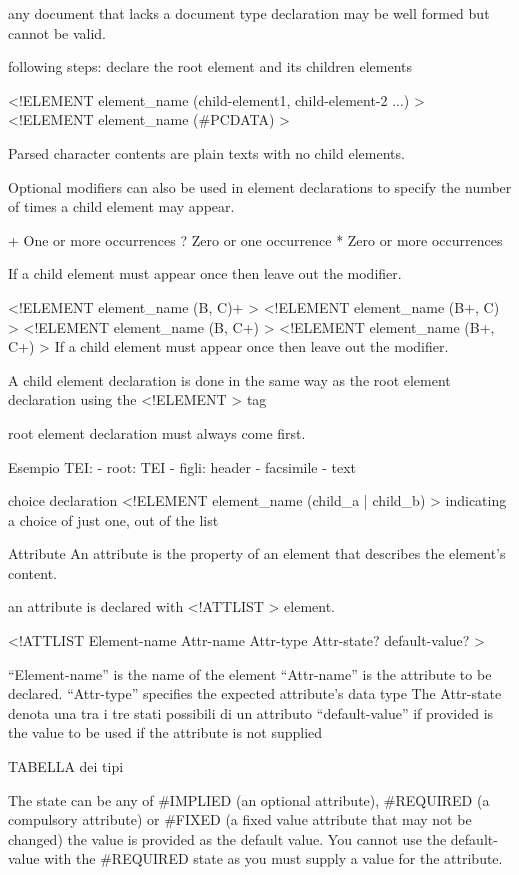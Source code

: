 any document that lacks a document type declaration may be well formed but
cannot be valid.


following steps:
declare the root element and its children elements

<!ELEMENT element_name (child-element1, child-element-2 ...) >
<!ELEMENT element_name (#PCDATA) >

Parsed character contents are plain texts with no child elements.

Optional modifiers can also be used in element declarations to specify the
number of times a child element may appear.

+ One or more occurrences 
? Zero or one occurrence 
* Zero or more occurrences

If a child element must appear once then leave out the modifier.

<!ELEMENT element_name (B, C)+ >
<!ELEMENT element_name (B+, C) >
<!ELEMENT element_name (B, C+) >
<!ELEMENT element_name (B+, C+) >
If a child element must appear once then leave out the modifier.

A child element declaration is done in the same way as the root element
declaration using the <!ELEMENT > tag

root element declaration must always come first.

Esempio TEI:
- root: TEI
- figli: header - facsimile - text

choice declaration
<!ELEMENT element_name (child_a | child_b) >
indicating a choice of just one, out of the list


Attribute
An attribute is the property of an element that describes the element’s content.

an attribute is declared with <!ATTLIST > element.

<!ATTLIST Element-name Attr-name Attr-type Attr-state? default-value? >

``Element-name'' is the name of the element
``Attr-name'' is the attribute to be declared.
``Attr-type'' specifies the expected attribute’s data type
The Attr-state denota una tra i tre stati possibili di un attributo 
``default-value'' if provided is the value to be used if the attribute is not
supplied

TABELLA dei tipi

The state can be any of #IMPLIED (an optional attribute), #REQUIRED (a compulsory attribute) or #FIXED (a fixed value
attribute that may not be changed) the value is provided as the default value. You cannot use the default-value with the #REQUIRED state as you must
supply a value for the attribute.

